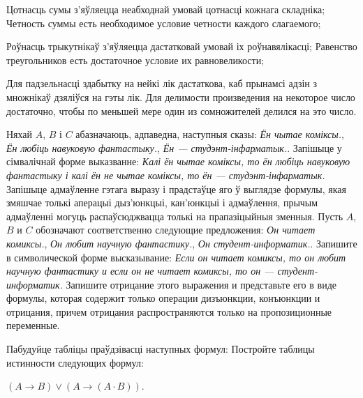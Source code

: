 \begin{problemList}
\begin{belarusianEnumerate}
\problemItemSimple
{Цотнасць сумы з'яўляецца неабходнай умовай цотнасці кожнага складніка;}
{Четность суммы есть необходимое условие четности каждого слагаемого;}

\problemItemSimple
{Роўнасць трыкутнікаў з'яўляецца дастатковай умовай іх роўнавялікасці;}
{Равенство треугольников есть достаточное условие их равновеликости;}

\problemItemSimple
{Для падзельнасці здабытку на нейкі лік дастаткова, каб прынамсі адзін з множнікаў дзяліўся на гэты лік.}
{Для делимости произведения на некоторое число достаточно, чтобы по меньшей мере один из сомножителей делился на это число.}

\end{belarusianEnumerate}

\bigskip

\problemItemSimple
{Няхай $A$, $B$ і $C$ абазначаюць, адпаведна, наступныя сказы:
\textit{\guillemotleft Ён чытае коміксы.\guillemotright},
\textit{\guillemotleft Ён любіць навуковую фантастыку.\guillemotright},
\textit{\guillemotleft Ён --- студэнт-інфарматык.\guillemotright}.
Запішыце у сімвалічнай форме выказванне: \textit{\guillemotleft Калі ён чытае коміксы,
то ён любіць навуковую фантастыку і калі ён не чытае коміксы, то ён ---
студэнт-інфарматык.\guillemotright} Запішыце адмаўленне гэтага выразу і прадстаўце яго ў выглядзе формулы,
якая змяшчае толькі аперацыі дыз'юнкцыі, кан'юнкцыі і адмаўлення, прычым адмаўленні могуць распаўсюджвацца
толькі на прапазіцыйныя зменныя.}
{Пусть $A$, $B$ и $C$ обозначают соответственно следующие предложения:
\textit{\guillemotleft Он читает комиксы.\guillemotright},
\textit{\guillemotleft Он любит научную фантастику.\guillemotright},
\textit{\guillemotleft Он студент-информатик.\guillemotright}.
Запишите в символической форме высказывание: \textit{\guillemotleft Если он читает
комиксы, то он любит научную фантастику и если он не читает комиксы, то он ---
студент-информатик.\guillemotright} Запишите отрицание этого выражения и представьте
его в виде формулы, которая содержит только операции дизъюнкции, конъюнкции и
отрицания, причем отрицания распространяются только на пропозиционные переменные.}

\bigskip

\problemItemWithCommonPart
{Пабудуйце табліцы праўдзівасці наступных формул:}
{Постройте таблицы истинности следующих формул:}
{%
\begin{belarusianEnumerate}

\item $(A \to B) \vee (A \to (A \cdot B))$.


\end{belarusianEnumerate}}
\end{problemList}
